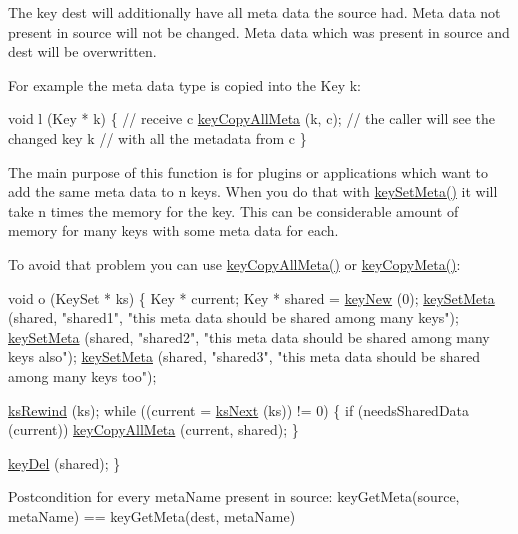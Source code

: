 The key dest will additionally have all meta data the source had. Meta data not present in source will not be changed. Meta data which was present in source and dest will be overwritten.

For example the meta data type is copied into the Key k\+:


\begin{DoxyCodeInclude}
\textcolor{keywordtype}{void} l (Key * k)
\{
        \textcolor{comment}{// receive c}
        \hyperlink{group__keymeta_ga8e63720a65610a29597494d0671f9401}{keyCopyAllMeta} (k, c);
        \textcolor{comment}{// the caller will see the changed key k}
        \textcolor{comment}{// with all the metadata from c}
\}
\end{DoxyCodeInclude}
 The main purpose of this function is for plugins or applications which want to add the same meta data to n keys. When you do that with \hyperlink{group__keymeta_gae1f15546b234ffb6007d8a31178652b9}{key\+Set\+Meta()} it will take n times the memory for the key. This can be considerable amount of memory for many keys with some meta data for each.

To avoid that problem you can use \hyperlink{group__keymeta_ga8e63720a65610a29597494d0671f9401}{key\+Copy\+All\+Meta()} or \hyperlink{group__keymeta_ga9a22b992478e613c8788bd460b4a1f0c}{key\+Copy\+Meta()}\+:


\begin{DoxyCodeInclude}
\textcolor{keywordtype}{void} o (KeySet * ks)
\{
        Key * current;
        Key * shared = \hyperlink{group__key_gad23c65b44bf48d773759e1f9a4d43b89}{keyNew} (0);
        \hyperlink{group__keymeta_gae1f15546b234ffb6007d8a31178652b9}{keySetMeta} (shared, \textcolor{stringliteral}{"shared1"}, \textcolor{stringliteral}{"this meta data should be shared among many keys"});
        \hyperlink{group__keymeta_gae1f15546b234ffb6007d8a31178652b9}{keySetMeta} (shared, \textcolor{stringliteral}{"shared2"}, \textcolor{stringliteral}{"this meta data should be shared among many keys also"});
        \hyperlink{group__keymeta_gae1f15546b234ffb6007d8a31178652b9}{keySetMeta} (shared, \textcolor{stringliteral}{"shared3"}, \textcolor{stringliteral}{"this meta data should be shared among many keys too"});

        \hyperlink{group__keyset_gabe793ff51f1728e3429c84a8a9086b70}{ksRewind} (ks);
        \textcolor{keywordflow}{while} ((current = \hyperlink{group__keyset_ga317321c9065b5a4b3e33fe1c399bcec9}{ksNext} (ks)) != 0)
        \{
                \textcolor{keywordflow}{if} (needsSharedData (current)) \hyperlink{group__keymeta_ga8e63720a65610a29597494d0671f9401}{keyCopyAllMeta} (current, shared);
        \}

        \hyperlink{group__key_ga3df95bbc2494e3e6703ece5639be5bb1}{keyDel} (shared);
\}
\end{DoxyCodeInclude}
 \begin{DoxyPostcond}{Postcondition}
for every meta\+Name present in source\+: key\+Get\+Meta(source, meta\+Name) == key\+Get\+Meta(dest, meta\+Name)
\end{DoxyPostcond}

